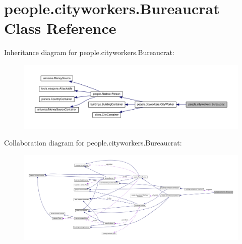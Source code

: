 \hypertarget{classpeople_1_1cityworkers_1_1_bureaucrat}{}\section{people.\+cityworkers.\+Bureaucrat Class Reference}
\label{classpeople_1_1cityworkers_1_1_bureaucrat}


Inheritance diagram for people.\+cityworkers.\+Bureaucrat\+:\nopagebreak
\begin{figure}[H]
\begin{center}
\leavevmode
\includegraphics[width=350pt]{classpeople_1_1cityworkers_1_1_bureaucrat__inherit__graph}
\end{center}
\end{figure}


Collaboration diagram for people.\+cityworkers.\+Bureaucrat\+:\nopagebreak
\begin{figure}[H]
\begin{center}
\leavevmode
\includegraphics[width=350pt]{classpeople_1_1cityworkers_1_1_bureaucrat__coll__graph}
\end{center}
\end{figure}
